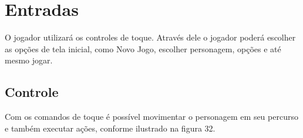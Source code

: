 \section {Entradas}
\label{ap:entradas}
O jogador utilizará os controles de toque. Através dele o jogador poderá escolher as opções de tela inicial, como Novo Jogo, escolher personagem, opções e até mesmo jogar.

\subsection {Controle}
Com os comandos de toque é possível movimentar o personagem em seu percurso e também executar ações, conforme ilustrado na figura 32.

\begin{figure}[h!]
		\centering
	\end{figure}

